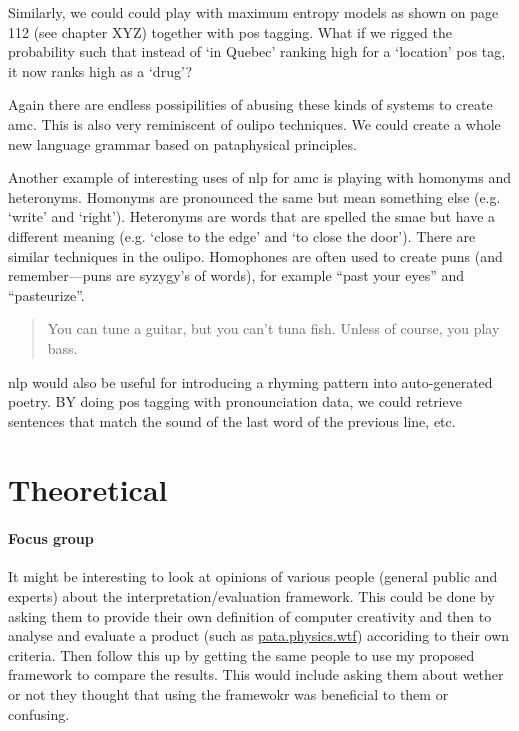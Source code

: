 Similarly, we could could play with maximum entropy models as shown on page 112 (see chapter XYZ) together with \gls{pos} tagging. What if we rigged the probability such that instead of `in Quebec' ranking high for a `location' \gls{pos} tag, it now ranks high as a `drug'?


Again there are endless possipilities of abusing these kinds of systems to create \gls{amc}. This is also very reminiscent of \gls{oulipo} techniques. We could create a whole new language grammar based on pataphysical principles.

Another example of interesting uses of \gls{nlp} for \gls{amc} is playing with homonyms and heteronyms. Homonyms are pronounced the same but mean something else (e.g. `write' and `right'). Heteronyms are words that are spelled the smae but have a different meaning (e.g. `close to the edge' and `to close the door'). There are similar techniques in the \gls{oulipo}. Homophones are often used to create puns (and remember---puns are syzygy's of words), for example ``past your eyes'' and ``pasteurize''. 

\begin{quotation}
   You can tune a guitar, but you can't tuna fish. Unless of course, you play bass. 
\end{quotation}

\gls{nlp} would also be useful for introducing a rhyming pattern into auto-generated poetry. BY doing \gls{pos} tagging with pronounciation data, we could retrieve sentences that match the sound of the last word of the previous line, etc.






\section{Theoretical}

\paragraph{Focus group}
It might be interesting to look at opinions of various people (general public and experts) about the interpretation/evaluation framework. This could be done by asking them to provide their own definition of computer creativity and then to analyse and evaluate a product (such as \url{pata.physics.wtf}) accoriding to their own criteria. Then follow this up by getting the same people to use my proposed framework to compare the results. This would include asking them about wether or not they thought that using the framewokr was beneficial to them or confusing.

